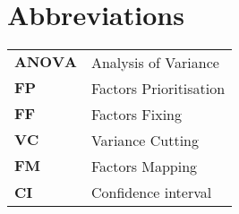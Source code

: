 
\section*{Abbreviations}

\hspace{20cm}

\begin{table}[H]

	\begin{tabular}{ll}
		\toprule
		$\textbf{ANOVA}$	& Analysis of Variance \\

		$\textbf{FP}$		& Factors Prioritisation \\

		$\textbf{FF}$		& Factors Fixing \\

		$\textbf{VC}$		& Variance Cutting \\

		$\textbf{FM}$		& Factors Mapping \\

		$\textbf{CI}$		& Confidence interval \\

		\bottomrule
	\end{tabular}
\end{table}